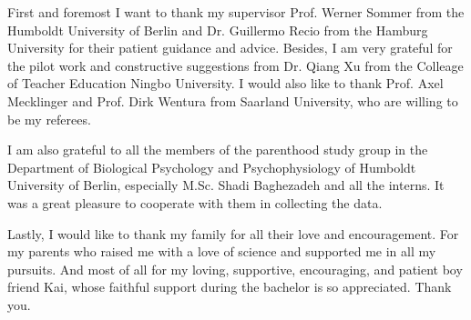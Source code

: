 First and foremost I want to thank my supervisor Prof. Werner Sommer from the Humboldt University of Berlin and Dr. Guillermo Recio from the Hamburg University for their patient guidance and advice. Besides, I am very grateful for the pilot work and constructive suggestions from Dr. Qiang Xu from the Colleage of Teacher Education Ningbo University. I would also like to thank Prof. Axel Mecklinger and Prof. Dirk Wentura from Saarland University, who are willing to be my referees.

I am also grateful to all the members of the parenthood study group in the Department of Biological Psychology and Psychophysiology of Humboldt University of Berlin, especially M.Sc. Shadi Baghezadeh and all the interns. It was a great pleasure to cooperate with them in collecting the data.

Lastly, I would like to thank my family for all their love and encouragement. For
my parents who raised me with a love of science and supported me in all my pursuits.
And most of all for my loving, supportive, encouraging, and patient boy friend Kai, whose
faithful support during the bachelor is so appreciated. Thank you.